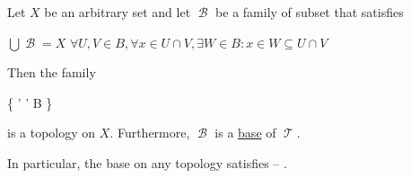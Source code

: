 \begin{proposition}\label{thm:topological_base_axioms}
  Let \( X \) be an arbitrary set and let \( \mscrB \) be a family of subset that satisfies
  \begin{thmenum}
     \( \bigcup \mscrB = X \)
     \( \forall U, V \in B, \forall x \in U \cap V, \exists W \in B: x \in W \subseteq U \cap V \)
  \end{thmenum}

  Then the family
  \begin{balign}\label{thm:topological_base_axioms/topology}
    \mscrT \coloneqq \left\{ \bigcup \mscrB' \colon \mscrB' \subseteq B \right\}
  \end{balign}
  is a topology on \( X \). Furthermore, \( \mscrB \) is a \hyperref[def:topological_base]{base} of \( \mscrT \).

  In particular, the base on any topology satisfies  -- .
\end{proposition}
